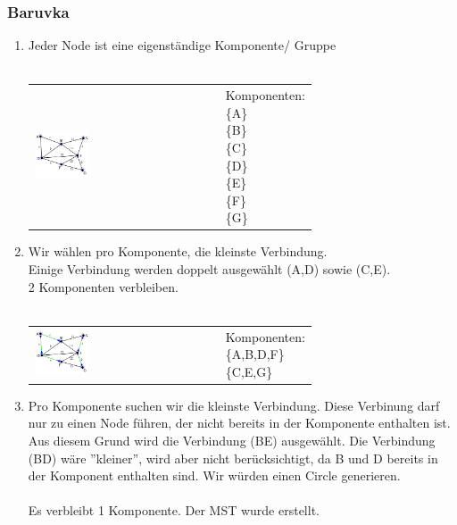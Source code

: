 \documentclass[a4paper,10pt]{report}
\begin{document}
\subsubsection{Baruvka}
\begin{enumerate}
	\item
		Jeder Node ist eine eigenständige Komponente/ Gruppe\\
		\\
		\begin{tabularx}{\textwidth}{XX}
			 \vspace{-2cm} 
			 \includegraphics[width=0.3\textwidth]{img/baruvka1.png}
			&
			\pbox{0.3\textwidth}{
			Komponenten:\\
			\{A\}\\
			\{B\}\\
			\{C\}\\
			\{D\}\\
			\{E\}\\
			\{F\}\\
			\{G\}\\
			}
		\end{tabularx}
	\item
		Wir wählen pro Komponente, die kleinste Verbindung.\\
		Einige Verbindung werden doppelt ausgewählt (A,D) sowie (C,E).\\
		2 Komponenten verbleiben.\\
		\\
		\begin{tabularx}{\textwidth}{XX}
			 \vspace{-0.8cm} 
			 \includegraphics[width=0.3\textwidth]{img/baruvka2.png}
			&
			\pbox{0.3\textwidth}{
			Komponenten:\\
			\{A,B,D,F\}\\
			\{C,E,G\}
			}
		\end{tabularx}
	\item
		Pro Komponente suchen wir die kleinste Verbindung. Diese Verbinung darf nur zu einen Node führen, der nicht bereits in der Komponente enthalten ist. Aus diesem Grund wird die Verbindung (BE) ausgewählt. Die Verbindung (BD) wäre ''kleiner'', wird aber nicht berücksichtigt, da B und D bereits in der Komponent enthalten sind. Wir würden einen Circle generieren.\\
		\\
		Es verbleibt 1 Komponente. Der MST wurde erstellt.\\


\end{enumerate}
\end{document}
